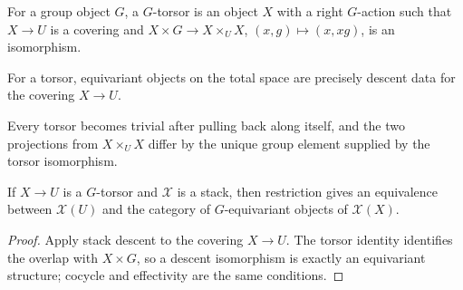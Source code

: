 \begin{definition}[torsor]\label{fga-def-4-42}
For a group object $G$, a $G$-torsor is an object $X$ with a right $G$-action
such that $X\to U$ is a covering and $X\times G\to X\times_U X$,
$(x,g)\mapsto(x,xg)$, is an isomorphism.
\end{definition}
\begin{proposition}\label{fga-prop-4-43}
For a torsor, equivariant objects on the total space are precisely descent data
for the covering $X\to U$.
\end{proposition}
\begin{lemma}\label{fga-lem-4-44}
Every torsor becomes trivial after pulling back along itself, and the two
projections from $X\times_UX$ differ by the unique group element supplied by
the torsor isomorphism.
\end{lemma}
\begin{theorem}\label{fga-thm-4-46}
If $X\to U$ is a $G$-torsor and $\mathcal X$ is a stack, then restriction gives
an equivalence between $\mathcal X(U)$ and the category of $G$-equivariant
objects of $\mathcal X(X)$.
\end{theorem}
\begin{proof}
Apply stack descent to the covering $X\to U$.  The torsor identity identifies
the overlap with $X\times G$, so a descent isomorphism is exactly an equivariant
structure; cocycle and effectivity are the same conditions.
\end{proof}
